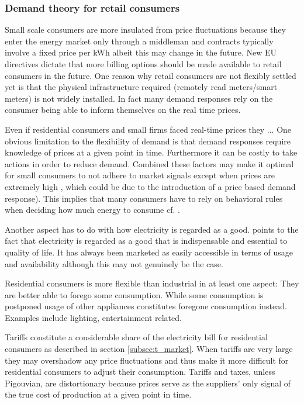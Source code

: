 \subsubsection*{Demand theory for retail consumers}
\vspace{-5mm}
Small scale consumers are more insulated from price fluctuations because they enter the energy market only through a middleman and contracts typically involve a fixed price per kWh albeit this may change in the future. New EU directives dictate that more billing options should be made available to retail consumers in the future. One reason why retail consumers are not flexibly settled yet is that the physical infrastructure required (remotely read meters/smart meters) is not widely installed. In fact many demand responses rely on the consumer being able to inform themselves on the real time prices.
\par

Even if residential consumers and small firms faced real-time prices they ...
One obvious limitation to the flexibility of demand is that demand responses require knowledge of prices at a given point in time. Furthermore it can be costly to take actions in order to reduce demand. Combined these factors may make it optimal for small consumers to not adhere to market signals except when prices are extremely high \citep{wolak2011residential}, which could be due to the introduction of a price based demand response). This implies that many consumers have to rely on behavioral rules when deciding how much energy to consume cf. \citep{kirschen2003demand}.
\par
 Another aspect has to do with how electricity is regarded as a good. \citet{kirschen2003demand} points to the fact that electricity is regarded as a good that is indispensable and essential to quality of life. It has always been marketed as easily accessible in terms of usage and availability although this may not genuinely be the case.
 \par

 Residential consumers is more flexible than industrial in at least one aspect: They are better able to forego some consumption. While some consumption is postponed usage of other appliances constitutes foregone consumption instead. Examples include lighting, entertainment related.

Tariffs constitute a considerable share of the electricity bill for residential consumers as described in section \ref{subsec:t_market}. When tariffs are very large they may overshadow any price fluctuations and thus make it more difficult for residential consumers to adjust their consumption. Tariffs and taxes, unless Pigouvian, are distortionary because prices serve as the suppliers' only signal of the true cost of production at a given point in time.

